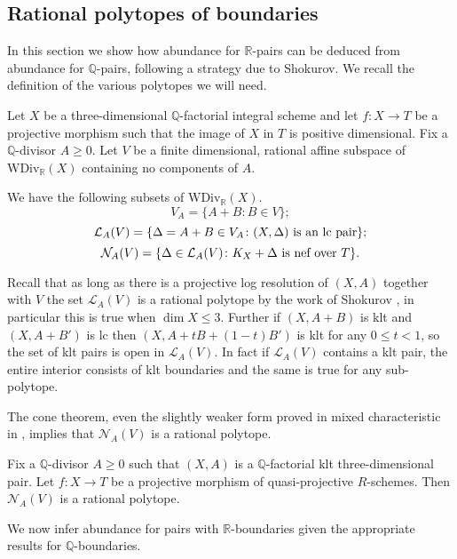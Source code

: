 	\subsection{Rational polytopes of boundaries}
	
	In this section we show how abundance for $\mathbb{R}$-pairs can be deduced from abundance for $\mathbb{Q}$-pairs, following a strategy due to Shokurov.
	We recall the definition of the various polytopes we will need.
	
	\begin{definition}
		Let  $X$ be a three-dimensional $\mathbb{Q}$-factorial integral scheme and let $f \colon X \to T$ be a projective morphism such that the image of $X$ in $T$ is positive dimensional. 
		Fix a $\mathbb{Q}$-divisor $A\geq 0$. Let $V$ be a finite dimensional, rational affine subspace of $\text{WDiv}_{\mathbb{R}}(X)$ containing no components of $A$.
		
		We have the following subsets of $\text{WDiv}_\mathbb{R}(X)$.
		\[V_{A}= \{A+B \colon B \in V\};\]
		\[\mathcal{L}_{A}(V)=\{\Delta=A+B \in V_{A} \colon (X,\Delta) \textup{ is an lc pair}\};\]
		\[\mathcal{N}_{A}(V)=\{\Delta \in \mathcal{L}_{A}(V) \colon K_{X}+\Delta \textup{ is nef over } T\}.\]
	\end{definition}
	
	Recall that as long as there is a projective log resolution of $(X,A)$ together with $V$ the set $\mathcal{L}_{A}(V)$ is a rational polytope by the work of Shokurov \cite{Sho92}, in particular this is true when $\dim X \leq 3$. Further if $(X,A+B)$ is klt and $(X,A+B')$ is lc then $(X,A+tB+(1-t)B')$ is klt for any $0 \leq t < 1$, so the set of klt pairs is open in $\mathcal{L}_{A}(V)$. In fact if $\mathcal{L}_{A}(V)$ contains a klt pair, the entire interior consists of klt boundaries and the same is true for any sub-polytope.
	
	The cone theorem, even the slightly weaker form proved in mixed characteristic in \cite{bhatt2020}, implies that $\mathcal{N}_{A}(V)$ is a rational polytope. 
	
	\begin{lemma}\label{neftope} \cite[Proposition 9.31]{bhatt2020}
		Fix a $\mathbb{Q}$-divisor $A \geq 0$ such that $(X,A)$ is a $\mathbb{Q}$-factorial klt three-dimensional pair.
		Let $f\colon X \to T$ be a projective morphism of quasi-projective $R$-schemes.
		Then $\mathcal{N}_{A}(V)$ is a rational polytope.
	\end{lemma}
	
	We now infer abundance for pairs with $\mathbb{R}$-boundaries given the appropriate results for $\mathbb{Q}$-boundaries.
	
